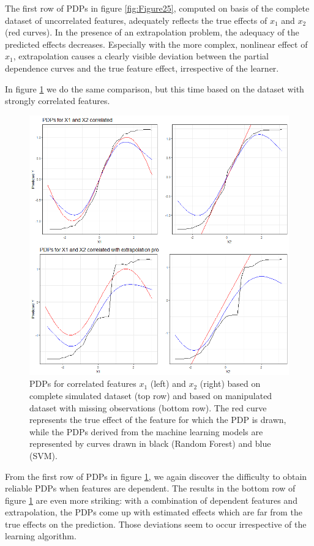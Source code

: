 \documentclass[]{krantz}
\begin{document}
The first row of PDPs in figure \ref{fig:Figure25}, computed on basis of
the complete dataset of uncorrelated features, adequately reflects the
true effects of \(x_1\) and \(x_2\) (red curves). In the presence of an
extrapolation problem, the adequacy of the predicted effects decreases.
Especially with the more complex, nonlinear effect of \(x_1\),
extrapolation causes a clearly visible deviation between the partial
dependence curves and the true feature effect, irrespective of the
learner.

In figure \ref{fig:Figure26} we do the same comparison, but this time
based on the dataset with strongly correlated features.

\begin{figure}

\includegraphics[width=0.9\linewidth]{images/VK_PDP_26_Extrapol_cor} \hfill{}

\caption{PDPs for correlated features $x_1$ (left) and $x_2$ (right) based on complete simulated dataset (top row) and based on manipulated dataset with missing observations (bottom row). The red curve represents the true effect of the feature for which the PDP is drawn, while the PDPs derived from the machine learning models are represented by curves drawn in black (Random Forest) and blue (SVM).}\label{fig:Figure26}
\end{figure}

From the first row of PDPs in figure \ref{fig:Figure26}, we again
discover the difficulty to obtain reliable PDPs when features are
dependent. The results in the bottom row of figure \ref{fig:Figure26}
are even more striking: with a combination of dependent features and
extrapolation, the PDPs come up with estimated effects which are far
from the true effects on the prediction. Those deviations seem to occur
irrespective of the learning algorithm.
\end{document}
